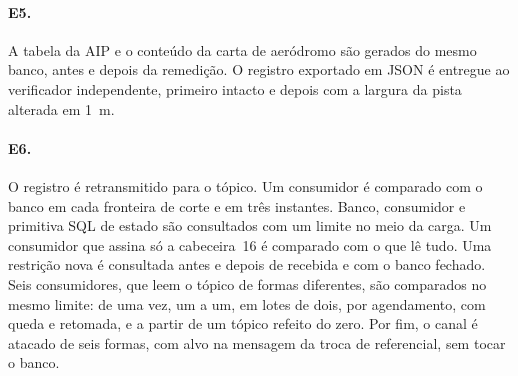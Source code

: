 \paragraph*{E5.} A tabela da AIP e o conteúdo da carta de aeródromo são gerados do mesmo banco, antes e depois da remedição. O registro exportado em JSON é entregue ao verificador independente, primeiro intacto e depois com a largura da pista alterada em 1~m.

\paragraph*{E6.} O registro é retransmitido para o tópico. Um consumidor é comparado com o banco em cada fronteira de corte e em três instantes. Banco, consumidor e primitiva SQL de estado são consultados com um limite no meio da carga. Um consumidor que assina só a cabeceira~16 é comparado com o que lê tudo. Uma restrição nova é consultada antes e depois de recebida e com o banco fechado. Seis consumidores, que leem o tópico de formas diferentes, são comparados no mesmo limite: de uma vez, um a um, em lotes de dois, por agendamento, com queda e retomada, e a partir de um tópico refeito do zero. Por fim, o canal é atacado de seis formas, com alvo na mensagem da troca de referencial, sem tocar o banco.
